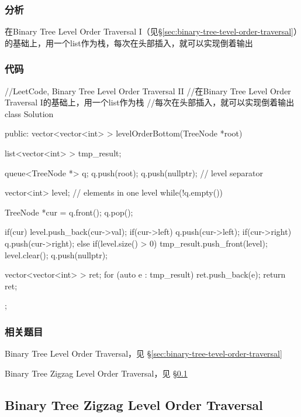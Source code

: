 \subsubsection{分析}
在Binary Tree Level Order Traversal I（见\S \ref{sec:binary-tree-tevel-order-traversal}）的基础上，用一个list作为栈，每次在头部插入，就可以实现倒着输出


\subsubsection{代码}
\begin{Code}
//LeetCode, Binary Tree Level Order Traversal II
//在Binary Tree Level Order Traversal I的基础上，用一个list作为栈
//每次在头部插入，就可以实现倒着输出
class Solution {
public:
    vector<vector<int> > levelOrderBottom(TreeNode *root) {
        list<vector<int> > tmp_result;

        queue<TreeNode *> q;
        q.push(root);
        q.push(nullptr); // level separator

        vector<int> level;  // elements in one level
        while(!q.empty()) {
            TreeNode *cur = q.front(); q.pop();

            if(cur) {
                level.push_back(cur->val);
                if(cur->left) q.push(cur->left);
                if(cur->right) q.push(cur->right);
            } else {
                if(level.size() > 0) {
                    tmp_result.push_front(level);
                    level.clear();
                    q.push(nullptr);
                }
            }
        }

        vector<vector<int> > ret;
        for (auto e : tmp_result) {
            ret.push_back(e);
        }
        return ret;
    }
};
\end{Code}


\subsubsection{相关题目}
\begindot
\item Binary Tree Level Order Traversal，见 \S \ref{sec:binary-tree-tevel-order-traversal}
\item Binary Tree Zigzag Level Order Traversal，见 \S \ref{sec:binary-tree-zigzag-level-order-traversal}
\myenddot


\subsection{Binary Tree Zigzag Level Order Traversal}
\label{sec:binary-tree-zigzag-level-order-traversal}


